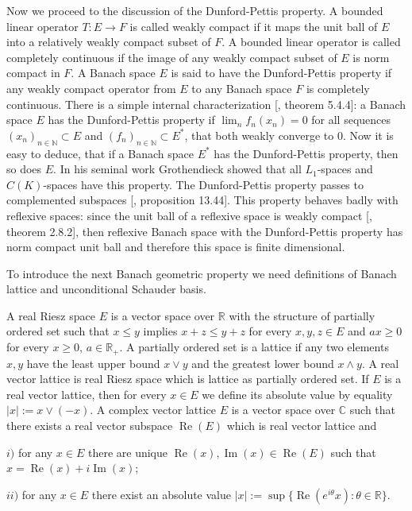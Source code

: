 Now we proceed to the discussion of the Dunford-Pettis property. A bounded linear operator $T:E\to F$ is called weakly compact if it maps the unit ball of $E$ into a relatively weakly compact subset of $F$. A bounded linear operator is called completely continuous if the image of any weakly compact subset of $E$ is norm compact in $F$. A Banach space $E$ is said to have the Dunford-Pettis property if any weakly compact operator from $E$ to any Banach space $F$ is completely continuous. There is a simple internal characterization [\cite{KalAlbTopicsBanSpTh}, theorem 5.4.4]: a Banach space $E$ has the Dunford-Pettis property if $\lim_n f_n(x_n)=0$ for all sequences $(x_n)_{n\in\mathbb{N}}\subset E$ and $(f_n)_{n\in\mathbb{N}}\subset E^*$, that both weakly converge to $0$. Now it is easy to deduce, that if a Banach space $E^*$ has the Dunford-Pettis property, then so does $E$. In his seminal work \cite{GrothApllFaiblCompSpCK} Grothendieck showed that all $L_1$-spaces and $C(K)$-spaces have this property. The Dunford-Pettis property passes to complemented subspaces [\cite{FabHabBanSpTh}, proposition 13.44]. This property behaves badly with reflexive spaces: since the unit ball of a reflexive space is weakly compact [\cite{MeggIntroBanSpTh}, theorem 2.8.2], then reflexive Banach space with the Dunford-Pettis property has norm compact unit ball and therefore this space is finite dimensional. 

To introduce the next Banach geometric property we need definitions of Banach lattice and unconditional Schauder basis. 

A real Riesz space $E$ is a vector space over $\mathbb{R}$ with the structure of partially ordered set such that $x\leq y$ implies $x+z\leq y+z$ for every $x,y,z\in E$ and $ax\geq 0$ for every $x\geq 0$, $a\in\mathbb{R}_+$. A partially ordered set is a lattice if any two elements ${x,y}$ have the least upper bound $x\vee y$ and the greatest lower bound $x\wedge y$. A real vector lattice is real Riesz space which is lattice as partially ordered set. If $E$ is a real vector lattice, then for every $x\in E$ we define its absolute value by equality $|x|:=x\vee(-x)$. A complex vector lattice $E$ is a vector space over $\mathbb{C}$ such that there exists a real vector subspace $\operatorname{Re}(E)$ which is real vector lattice and

$i)$ for any $x\in E$ there are unique $\operatorname{Re}(x),\operatorname{Im}(x)\in \operatorname{Re}(E)$ such that $x=\operatorname{Re}(x)+i\operatorname{Im}(x)$;

$ii)$ for any $x\in E$ there exist an absolute value $|x|:=\sup\{\operatorname{Re}(e^{i\theta}x):\theta\in\mathbb{R}\}$.

